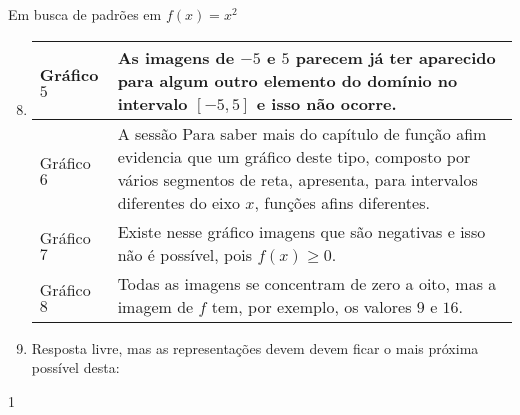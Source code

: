 \clearmargin
\begin{answer}{Em busca de padrões em \(f(x)=x^2\)}
{
\begin{enumerate}\setcounter{enumi}{7}
\item {}
{
\resizebox{.9\linewidth}{!}
{
\begin{tabular}{|e{.15\linewidth}|e{.8\linewidth}|}
\hline
Gráfico \(5\) & As imagens de \(-5\) e \(5\) parecem já ter aparecido para algum outro elemento do domínio no intervalo \([-5,5]\) e isso não ocorre. \tabularnewline
\hline
Gráfico \(6\) & A sessão Para saber mais do capítulo de função afim evidencia que um gráfico deste tipo, composto por vários segmentos de reta, apresenta, para intervalos diferentes do eixo \(x\), funções afins diferentes. \tabularnewline
\hline
Gráfico \(7\) & Existe nesse gráfico imagens que são negativas e isso não é possível, pois \(f(x) \geq 0\). \tabularnewline
\hline
Gráfico \(8\) & Todas as imagens se concentram de zero a oito, mas a imagem de \(f\) tem, por exemplo, os valores \(9\) e \(16\). \tabularnewline
\hline
\end{tabular}

}}

\item Resposta livre, mas as representações devem devem ficar o mais próxima possível desta:
\end{enumerate}
}{1}
\end{answer}

